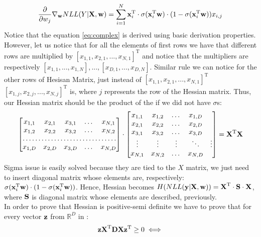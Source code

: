 \documentclass[10pt,a4paper]{article}
\begin{document}
\begin{enumerate}
\begin{enumerate}
\begin{align}
\frac{\partial}{\partial w_j}\nabla_{\textbf{\text{{w}}}}NLL(Y|\textbf{\text{{X}}}, \textbf{\text{{w}}}) = \sum_{i=1}^N  \textbf{\text{{x}}}_i ^ \text{T} \cdot \sigma(\textbf{\text{{x}}} ^ \text{T}_i \textbf{\text{{w}}}) \cdot (1-\sigma(\textbf{\text{{x}}} ^ \text{T}_i \textbf{\text{{w}}}))x_{i,j} \label{eq:complex}
\end{align}
Notice that the equation \ref{eq:complex} is derived using basic derivation properties. However, let us notice that for all the elements of first rows we have that different rows are multiplied by $[x_{1,1}, x_{2,1}, ..., x_{N, 1}]^\text{T}$ and notice that the multipliers are respectively $[x_{1, 1}, ..., x_{1, N}], ...,  [x_{D, 1}, ..., x_{D, N}]$. Similar rule we can notice for the other rows of Hesisan Matrix, just instead of $[x_{1,1}, x_{2,1}, ..., x_{N, 1}]^\text{T}$ $[x_{1,j}, x_{2,j}, ..., x_{N, j}]^\text{T}$ is, where $j$ represents the row of the Hessian matrix. Thus, our Hessian matrix should be the product of the if we did not have $\sigma$s:
\begin{equation}
\begin{bmatrix}
    x_{1,1}       & x_{2, 1} & x_{3, 1} & \dots & x_{N, 1} \\
    x_{1,2}       & x_{2, 2} & x_{3, 2} & \dots & x_{N, 2} \\
    \hdotsfor{5} \\
    x_{1, D}       & x_{2, D} & x_{3, D} & \dots & x_{N, D}
\end{bmatrix} \cdot
\begin{bmatrix}
    x_{1,1} & x_{1, 2} & \dots  & x_{1, D} \\
    x_{2, 1} & x_{2, 2} &\dots  & x_{2, D} \\
    x_{3, 1} & x_{3, 2} &\dots  & x_{3, D} \\
    \vdots & \vdots & \vdots & \ddots & \vdots \\
    x_{N, 1} & x_{N, 2} & \dots  & x_{N, D}
\end{bmatrix} = \transpose{\mat{X}} \mat{X}
\end{equation}
Sigma issue is easily solved because they are tied to the $X$ matrix, we just need to insert diagonal matrix whose elements are, respectively: $\sigma(\textbf{\text{{x}}} ^ \text{T}_i \textbf{\text{{w}}}) \cdot (1-\sigma(\textbf{\text{{x}}} ^ \text{T}_i \textbf{\text{{w}}}))$. Hence, Hessian becomes $H(NLL(\textbf{\text{{y}}}|\textbf{\text{{X}}}, \textbf{\text{{w}}})) = \textbf{\text{{X}}} ^ \text{T}\cdot \textbf{\text{{S}}} \cdot \textbf{\text{{X}}}$, where $\textbf{\text{{S}}}$ is diagonal matrix whose elements are described, previously.
\\
In order to prove that Hessian is positive-semi definite we have to prove that for every vector $\textbf{\text{{z}}}$ from $\mathbb{R}^D$ in :
\begin{align}
\vect{z}\transpose{\mat{X}}\mat{D}\mat{X}\transpose{\vect{z}} \geq 0 \iff \nonumber \\

\end{align}
\end{enumerate}
\end{enumerate}
\end{document}
